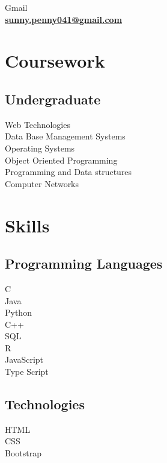\documentclass[]{deedy-resume-openfont}
\begin{document}
\begin{minipage}[t]{0.33\textwidth}
 \textbullet{} Gmail  \href{mailto:sunny.penny041@gmail.com}{\\ \textbf{sunny.penny041@gmail.com}}


\section{Coursework}

\subsection{Undergraduate}
 \textbullet{} Web Technologies \\
 \textbullet{} Data Base Management Systems \\
 \textbullet{} Operating Systems \\
 \textbullet{} Object Oriented Programming \\
 \textbullet{} Programming and Data structures \\
  \textbullet{} Computer Networks
 


\section{Skills}
\subsection{Programming Languages}
 \textbullet{}C \\ \textbullet{} Java \\ \textbullet{}Python \\ \textbullet{}C++
\\  \textbullet{} SQL 
\\  \textbullet{} R \\  \textbullet{} JavaScript  \\
 \textbullet{} Type Script  
\vspace{0.10cm}  
\subsection{Technologies}
\textbullet{} HTML  \\ \textbullet{} CSS \\
 \textbullet{} Bootstrap \\
\sectionsep


\end{minipage}
\end{document}
